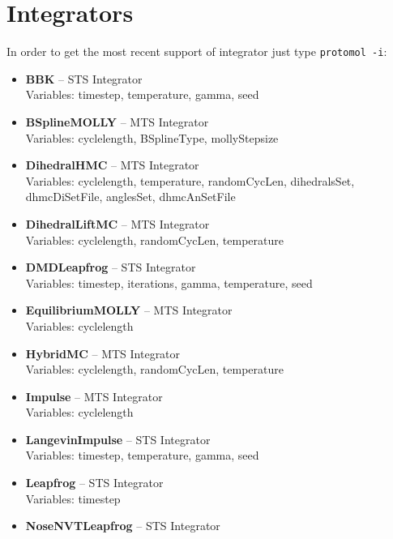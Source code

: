 \documentclass{article}
\begin{document}
\section{Integrators}
In order to get the most recent support of integrator just type \texttt{protomol -i}:
\begin{itemize}
\item \textbf{BBK} -- STS Integrator\\
Variables:
    timestep,           
    temperature,        
    gamma,              
    seed               
\item \textbf{BSplineMOLLY} -- MTS Integrator\\
Variables:
    cyclelength,        
    BSplineType,        
    mollyStepsize      
\item \textbf{DihedralHMC} -- MTS Integrator\\
Variables:
    cyclelength,        
    temperature,        
    randomCycLen,       
    dihedralsSet,       
    dhmcDiSetFile,      
    anglesSet,          
    dhmcAnSetFile      
\item \textbf{DihedralLiftMC} -- MTS Integrator\\
Variables:
    cyclelength,        
    randomCycLen,       
    temperature        
\item \textbf{DMDLeapfrog} -- STS Integrator\\
Variables:
    timestep,           
    iterations,         
    gamma,              
    temperature,        
    seed               
\item \textbf{EquilibriumMOLLY} -- MTS Integrator\\
Variables:
    cyclelength        
\item \textbf{HybridMC} -- MTS Integrator\\
Variables:
    cyclelength,        
    randomCycLen,       
    temperature        
\item \textbf{Impulse} -- MTS Integrator\\
Variables:
    cyclelength        
\item \textbf{LangevinImpulse} -- STS Integrator\\
Variables:
    timestep,           
    temperature,        
    gamma,              
    seed               
\item \textbf{Leapfrog} -- STS Integrator\\
Variables:
    timestep           
\item \textbf{NoseNVTLeapfrog} -- STS Integrator\\

\end{itemize}
\end{document}
